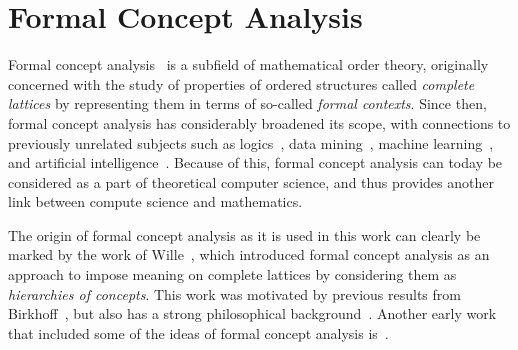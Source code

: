 \section{Formal Concept Analysis}
\label{sec:learn-impl-using}

Formal concept analysis~\cite{fca-book} is a subfield of mathematical order theory,
originally concerned with the study of properties of ordered structures called
\emph{complete lattices} by representing them in terms of so-called \emph{formal
  contexts}.  Since then, formal concept analysis has considerably broadened its scope,
with connections to previously unrelated subjects such as
logics~\cite{books/math/Prediger00,conf/iccs/FerreR00}, data
mining~\cite{arules:Zaki:1998}, machine learning~\cite{conf/icfca/Kuznetsov04}, and
artificial intelligence~\cite{phd/de/Rudolph2006,Diss-Felix}.  Because of this, formal
concept analysis can today be considered as a part of theoretical computer science, and
thus provides another link between compute science and mathematics.

The origin of formal concept analysis as it is used in this work can clearly be marked by
the work of Wille~\cite{fca:Wille:1982}, which introduced formal concept analysis as an
approach to impose meaning on complete lattices by considering them as \emph{hierarchies
  of concepts}.  This work was motivated by previous results from
Birkhoff~\cite{books/math/Birkhoff67}, but also has a strong philosophical
background~\cite{books/phil/Hentig72,Wille:Begriffsdenken}.  Another early work that
included some of the ideas of formal concept analysis is~\cite{OrdreEtClassification}.

